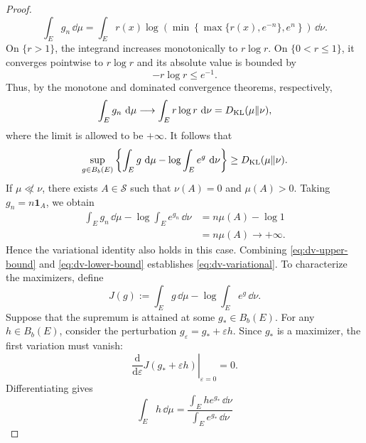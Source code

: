 \documentclass[12pt,a4paper,oneside]{book}
\begin{document}
\begin{proof}
\begin{equation*}
    \int_E g_n\,\dd\mu = \int_E r(x)\log\left(
        \min\left\{
            \max\{r(x),e^{-n}\},e^n
        \right\}
    \right)\,\dd\nu.
\end{equation*}
On $\{r>1\}$, the integrand increases monotonically to $r\log r$. On $\{0<r\leq1\}$, it converges pointwise to $r\log r$
and its absolute value is bounded by
\begin{equation*}
    -r\log r\leq e^{-1}.
\end{equation*}
Thus, by the monotone and dominated convergence theorems, respectively,
\begin{equation*}
    \int_E g_n\,\,\mathrm{d}\mu \longrightarrow
    \int_E r\log r\,\,\mathrm{d}\nu = D_{\mathrm{KL}}(\mu\Vert\nu),
\end{equation*}
where the limit is allowed to be $+\infty$. It follows that
\begin{equation}
    \sup_{g\in B_b(E)}
        \left\{
            \int_E g\,\,\mathrm{d}\mu - \log\int_E e^g\,\,\mathrm{d}\nu
        \right\}
    \geq D_{\mathrm{KL}}(\mu\Vert\nu).
    \label{eq:dv-lower-bound}
\end{equation}
If $\mu\not\ll\nu$, there exists $A\in\mathcal S$ such that $\nu(A)=0$ and $\mu(A)>0$. Taking $g_n=n\mathbf 1_A$, we obtain
\begin{equation*}
    \begin{aligned}
    \int_E g_n\,\dd\mu - \log\int_E e^{g_n}\,\dd\nu
    &= n\mu(A)-\log 1\\
    &= n\mu(A)\longrightarrow+\infty.
    \end{aligned}
\end{equation*}
Hence the variational identity also holds in this case. Combining \eqref{eq:dv-upper-bound} and \eqref{eq:dv-lower-bound}
establishes \eqref{eq:dv-variational}. To characterize the maximizers, define
\begin{equation*}
    J(g) := \int_E g\,\dd\mu - \log\int_E e^g\,\dd\nu.
\end{equation*}
Suppose that the supremum is attained at some $g_*\in B_b(E)$. For any $h\in B_b(E)$, consider the perturbation
$g_\varepsilon=g_*+\varepsilon h$. Since $g_*$ is a maximizer, the first variation must vanish:
\begin{equation*}
    \left.
        \frac{\mathrm d}{\mathrm d\varepsilon} J(g_*+\varepsilon h)
    \right|_{\varepsilon=0}
    =0.
\end{equation*}
Differentiating gives
\begin{equation*}
    \int_E h\,\dd\mu =
    \frac{
        \int_E he^{g_*}\,\dd\nu
    }{
        \int_E e^{g_*}\,\dd\nu
}
\end{equation*}
\end{proof}
\end{document}
